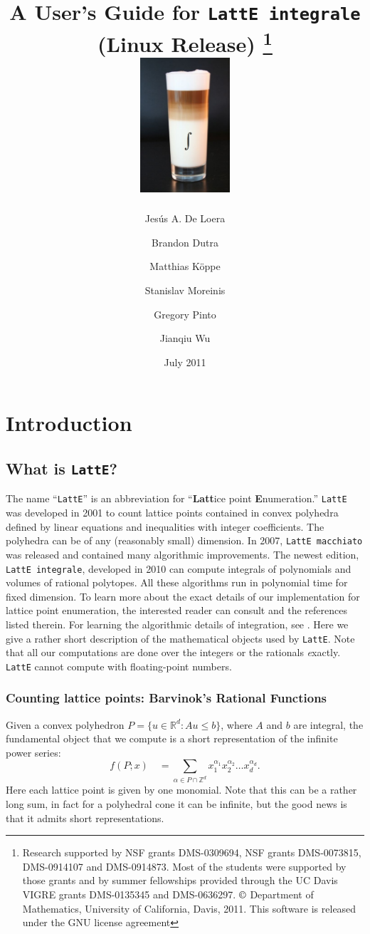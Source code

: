 \documentclass{article}
\title{A User's Guide for {\tt LattE integrale} \latteV \\ (Linux Release) 
\footnote{Research supported by NSF grants DMS-0309694, NSF grants
DMS-0073815, DMS-0914107 and DMS-0914873.
Most of the students were supported by those
grants and by summer fellowships provided through the UC Davis VIGRE grants
DMS-0135345 and DMS-0636297. $\copyright$ 
Department of Mathematics, University of California, Davis, 2011. This
software is released under the GNU license agreement}
\\ \includegraphics[width=0.25\textwidth]{latte-integrale.jpg}
}%
\author{Jes\'us A. De Loera \and
Brandon Dutra \and
Matthias K\"oppe \and 
Stanislav Moreinis \and
Gregory Pinto \and
Jianqiu Wu \and
}
\date{July 2011}
\newcommand{\Z}{{\mathbb Z}}
\newcommand{\R}{{\mathbb R}}
\newcommand{\latte}{{\tt LattE}\xspace}
\begin{document}
\maketitle{}

\newpage

\tableofcontents

\newpage

\section{Introduction}

\subsection{What is {\tt LattE}?} \label{intro}

The name ``{\tt LattE}'' is an abbreviation for ``{\bf Latt}ice point 
{\bf E}numeration.'' \latte was developed in 2001 to count lattice points contained in 
convex polyhedra defined by linear equations and inequalities with 
integer coefficients. The polyhedra can be of any (reasonably small) 
dimension. In 2007, {\tt LattE macchiato} was released and contained many 
algorithmic improvements. The newest edition, {\tt LattE integrale}, developed
in 2010 can compute integrals of polynomials and volumes of rational polytopes. 
All these algorithms run in polynomial
time for fixed dimension. To
learn more about the exact details of our implementation for lattice point enumeration, the interested reader can consult 
\cite{BarviPom, latte1,latte2,latte3} and the references listed therein. 
For learning the algorithmic details of integration, see \cite{howToIntegratePolynomialSimplex}. Here we
give a rather short description of the mathematical objects used by
{\tt LattE}. Note that all our computations are done over the integers or the rationals {\emph exactly}.
\latte cannot compute with floating-point numbers. 

\subsubsection{Counting lattice points: Barvinok's Rational Functions}

Given a convex polyhedron $P = \{u\in\R^d:Au\leq b\}$, where $A$ and
$b$ are integral, the fundamental object that we compute is a short 
representation of the infinite power series:
\[
f(P;x) \quad = \sum_{\alpha\in P\cap\Z^d} x_1^{\alpha_1}
x_2^{\alpha_2} \ldots x_d^{\alpha_d}.
\]
Here each lattice point is given by one monomial. Note that this can be 
a rather long sum, in fact for a polyhedral cone it can be infinite, but 
the good news is that it admits short representations.
\end{document}
